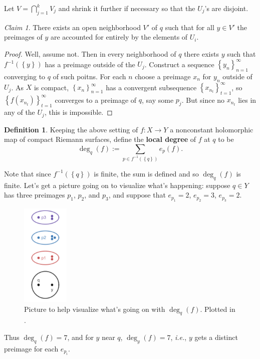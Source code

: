 \documentclass[12pt]{article}
\newcommand{\ita}[1]{\textit{#1}}
\newcommand\inv[1]{#1^{-1}}
\newcommand\setb[1]{\left \{ #1 \right \}}
\theoremstyle{definition}
\newtheorem{definition}[theorem]{Definition}
\theoremstyle{remark}
\newtheorem*{claim}{Claim}
\begin{document}
Let $V = \bigcap\limits_{j = 1}^k V_j$ and shrink it further if necessary so that the $U_j$'s are disjoint. 
\begin{claim}
    There exists an open neighborhood $V'$ of $q$ such that for all $y \in V'$ the preimages of $y$ are accounted for entirely by the elements of $U_i$.
\end{claim}
\begin{proof}
    Well, assume not. Then in every neighborhood of $q$ there exists $y$ such that $\inv{f} \left( \setb{y} \right)$ has a preimage outside of the $U_j$. Construct a sequence $\setb{y_n}_{n=1}^{\infty}$ converging to $q$ of such poitns. For each $n$ choose a preimage $x_n$ for $y_n$ outside of $U_j$. As $X$ is compact, $\setb{x_n}_{n=1}^{\infty}$ has a convergent subsequence $\setb{x_{n_t}}_{t=1}^{\infty}$, so $\left \{ f \left( x_{n_t} \right) \right \}_{t=1}^{\infty}$ converges to a preimage of $q$, say some $p_j$. But since no $x_{n_t}$ lies in any of the $U_j$, this is impossible.
\end{proof}
\begin{definition}
    Keeping the above setting of $f : X \to Y$ a nonconstant holomorphic map of compact Riemann surfaces, define the \textbf{local degree} of $f$ at $q$ to be 
    \begin{equation}
        \deg_q(f) := \sum\limits_{p \in \inv{f} \left( \setb{q} \right) } e_p(f).
    \end{equation}
\end{definition}
Note that since $\inv{f} \left( \setb{q} \right)$ is finite, the sum is defined and so $\deg_q(f)$ is finite. Let's get a picture going on to visualize what's happening: suppose $q \in Y$ has three preimages $p_1$, $p_2$, and $p_3$, and suppose that $e_{p_1} = 2$, $e_{p_2} = 3$, $e_{p_3} = 2$.
\begin{figure}[H]
    \centering
    \includegraphics[width=0.2\textwidth]{13.png}
    \caption{Picture to help visualize what's going on with $\deg_q(f)$. Plotted in \cite{Desmos}.}
    \label{fig:Fig13}
\end{figure}
Thus $\deg_q(f) = 7$, and for $y$ near $q$, $\deg_y(f) = 7$, \ita{i.e.}, $y$ gets a distinct preimage for each $e_{p_i}$.
\end{document}

